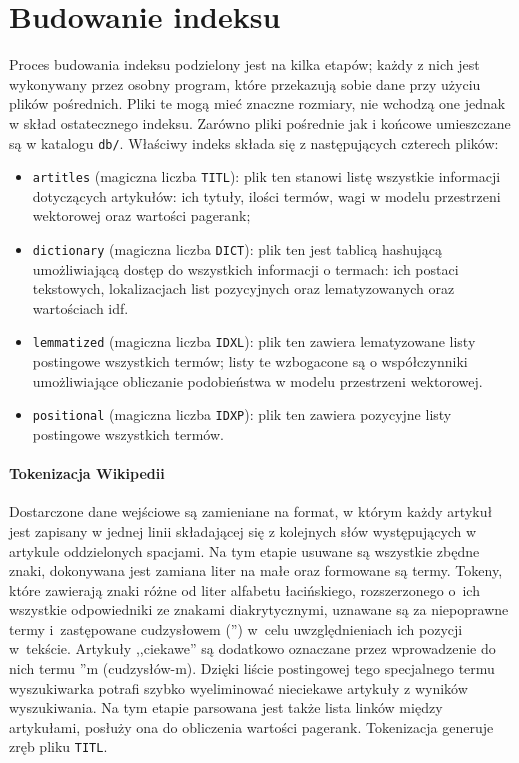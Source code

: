 \documentclass[a4paper,12pt]{article}
\begin{document}
\section{Budowanie indeksu}
Proces budowania indeksu podzielony jest na kilka etapów; każdy z nich jest
wykonywany przez osobny program, które przekazują sobie dane przy użyciu plików
pośrednich. Pliki te mogą mieć znaczne rozmiary, nie wchodzą one jednak w skład
ostatecznego indeksu. Zarówno pliki pośrednie jak i końcowe umieszczane są w
katalogu \texttt{db/}. Właściwy indeks składa się z następujących czterech plików:
\begin{itemize}
\item \texttt{artitles} (magiczna liczba \texttt{TITL}): plik ten stanowi listę
wszystkie informacji dotyczących artykułów: ich tytuły, ilości termów, wagi w
modelu przestrzeni wektorowej oraz wartości pagerank; 
\item \texttt{dictionary} (magiczna liczba \texttt{DICT}): plik ten jest tablicą
hashującą umożliwiającą dostęp do wszystkich informacji o termach: ich postaci
tekstowych, lokalizacjach list pozycyjnych oraz lematyzowanych oraz wartościach
idf.
\item \texttt{lemmatized} (magiczna liczba \texttt{IDXL}): plik ten zawiera
lematyzowane listy postingowe wszystkich termów; listy te wzbogacone są o
współczynniki umożliwiające obliczanie podobieństwa w modelu przestrzeni wektorowej.
\item \texttt{positional} (magiczna liczba \texttt{IDXP}): plik ten zawiera
pozycyjne listy postingowe wszystkich termów.
\end{itemize}

\paragraph{Tokenizacja Wikipedii} Dostarczone dane wejściowe są zamieniane
na format, w którym każdy artykuł jest zapisany w jednej linii składającej się
z kolejnych słów występujących w artykule oddzielonych spacjami. Na tym etapie
usuwane są wszystkie zbędne znaki, dokonywana jest zamiana liter na małe
oraz formowane są termy. Tokeny, które zawierają znaki różne od liter alfabetu
łacińskiego, rozszerzonego o~ich wszystkie odpowiedniki ze znakami diakrytycznymi,
uznawane są za niepoprawne termy i~zastępowane cudzysłowem ('') w~celu
uwzględnieniach ich pozycji w~tekście. Artykuły ,,ciekawe'' są dodatkowo
oznaczane przez wprowadzenie do nich termu ''m (cudzysłów-m). Dzięki liście
postingowej tego specjalnego termu wyszukiwarka potrafi szybko wyeliminować
nieciekawe artykuły z wyników wyszukiwania. Na tym etapie parsowana jest także
lista linków między artykułami, posłuży ona do obliczenia wartości pagerank. 
Tokenizacja generuje zręb pliku \texttt{TITL}.
\end{document}
